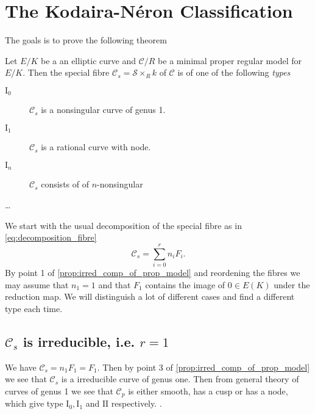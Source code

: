 \documentclass[a4paper]{article}
\begin{document}
\section{The Kodaira-Néron Classification} \label{sec:the_kodaira-néron_classification}

The goals is to prove the following theorem
\begin{theorem}
	Let $E / K$ be a an elliptic curve and $\mathcal{C}  / R$ be a minimal proper regular model for $E / K$.
	Then the special fibre $\mathcal{C} _s = \mathcal{S}  \times_R k$ of $\mathcal{C} $ is of one of the following \emph{types}
	\begin{description}
		\item[$\text{I}_0$] $\mathcal{C} _s$ is a nonsingular curve of genus 1. 
		\item[$\text{I}_1$ ] $\mathcal{C} _s$ is a rational curve with node. 
		\item[$\text{I}_n$ ] $\mathcal{C} _s$ consists of of $n$-nonsingular 
		\item[\ldots]
	\end{description}
\end{theorem}

We start with the usual decomposition of the special fibre as in \eqref{eq:decomposition_fibre} \[
	\mathcal{C}_s = \sum_{i = 0}^{r} n_i F_i
.\]  
By point 1 of \cref{prop:irred_comp_of_prop_model} and reordening the fibres we may assume that $n_1 = 1$ and that $F_1$ contains the image of $0 \in E (K)$ under the reduction map. We will distinguish a lot of different cases and find a different type each time.  
\subsection{$\mathcal{C} _s$ is irreducible, i.e. $r = 1$} \label{sec:C_s_is_irreducible,_i.e._r_=_1}
We have $\mathcal{C} _s = n_1 F_1 = F_1$. Then by point 3 of \cref{prop:irred_comp_of_prop_model} we see that  $\mathcal{C} _s$ is a irreducible curve of genus one. 
Then from general theory of curves of genus 1 we see that $\mathcal{C} _p$ is either smooth, has a cusp or has a node, which give type $\text{I}_0, \text{I}_1$ and $\text{II}$ respectively. . 
\end{document}
